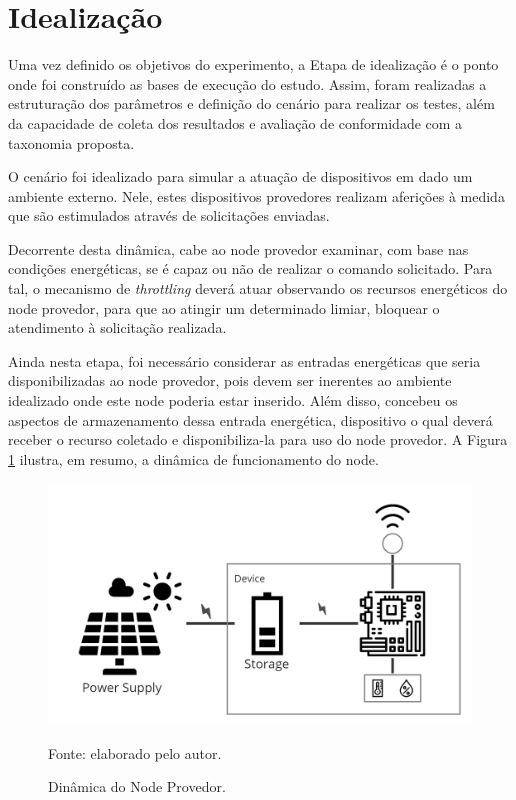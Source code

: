 \section{Idealização}
\label{cap6:idealizacao}
Uma vez definido os objetivos do experimento, a Etapa de idealização é o ponto onde foi construído as bases de execução do estudo. Assim, foram realizadas a estruturação  dos parâmetros e definição do cenário para realizar os testes, além da capacidade de coleta dos resultados e avaliação de conformidade com a taxonomia proposta.

O cenário foi idealizado para simular a atuação de dispositivos em dado um ambiente externo. Nele, estes dispositivos provedores realizam aferições à medida que são estimulados através de solicitações enviadas. 

Decorrente desta  dinâmica, cabe ao node provedor examinar, com base nas condições energéticas, se é capaz ou não de realizar o comando solicitado. Para tal, o mecanismo de \textit{throttling} deverá atuar observando os recursos energéticos do node provedor, para que ao atingir um determinado limiar, bloquear o atendimento à solicitação realizada.

Ainda nesta etapa, foi necessário considerar as entradas energéticas que seria disponibilizadas ao node provedor, pois devem ser inerentes ao ambiente idealizado onde este node poderia estar inserido. Além disso, concebeu os aspectos de armazenamento dessa entrada energética, dispositivo o qual deverá receber o recurso coletado e disponibiliza-la para uso do node provedor. A Figura \ref{fig:cap6dinamica} ilustra, em resumo, a dinâmica de funcionamento do node.

\begin{figure}[H]
	\centering
	
	\caption{Dinâmica do Node Provedor.}
	\label{fig:cap6dinamica}
	\noindent\includegraphics[width=0.75\linewidth]{Imagens/cap6/cap6dinamica.jpg} 
		
	Fonte: elaborado pelo autor.
\end{figure}


